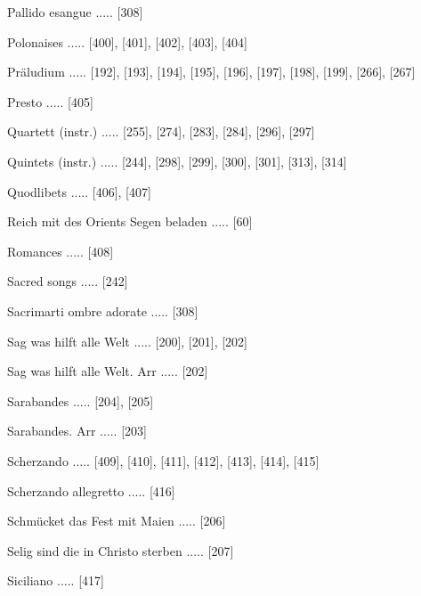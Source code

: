 \documentclass[twocolumn]{book}
\begin{document}
\newline 
Pallido esangue ..... [308]

\newline 
Polonaises ..... [400], [401], [402], [403], [404]

\newline 
Präludium ..... [192], [193], [194], [195], [196], [197], [198], [199], [266], [267]

\newline 
Presto ..... [405]

\newline 
Quartett (instr.) ..... [255], [274], [283], [284], [296], [297]

\newline 
Quintets (instr.) ..... [244], [298], [299], [300], [301], [313], [314]

\newline 
Quodlibets ..... [406], [407]

\newline 
Reich mit des Orients Segen beladen ..... [60]

\newline 
Romances ..... [408]

\newline 
Sacred songs ..... [242]

\newline 
Sacrimarti ombre adorate ..... [308]

\newline 
Sag was hilft alle Welt ..... [200], [201], [202]

\newline 
Sag was hilft alle Welt. Arr ..... [202]

\newline 
Sarabandes ..... [204], [205]

\newline 
Sarabandes. Arr ..... [203]

\newline 
Scherzando ..... [409], [410], [411], [412], [413], [414], [415]

\newline 
Scherzando allegretto ..... [416]

\newline 
Schmücket das Fest mit Maien ..... [206]

\newline 
Selig sind die in Christo sterben ..... [207]

\newline 
Siciliano ..... [417]
\end{document}
